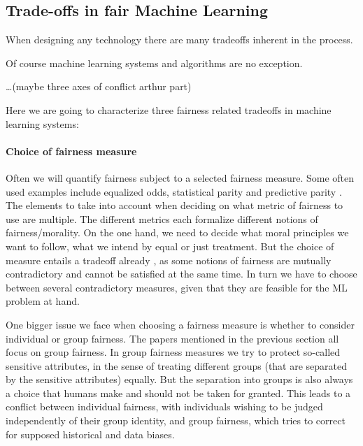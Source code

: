 
	\subsection{Trade-offs in fair Machine Learning}
	When designing any technology \cite{alexander1964notes} there are many tradeoffs inherent in the process.
	
	Of course machine learning systems and algorithms are no exception.

	\dots (maybe three axes of conflict arthur part)

	Here we are going to characterize three fairness related tradeoffs in machine learning systems:
	
	
	\paragraph{Choice of fairness measure}
	Often we will quantify fairness subject to a selected fairness measure.
	Some often used examples include equalized odds, statistical parity and predictive parity \cite{garg2020fairness}.
    The elements to take into account when deciding on what metric of fairness to use are multiple.
	The different metrics each formalize different notions of fairness/morality.
    On the one hand, we need to decide what moral principles we want to follow, \ie what we intend by equal or just treatment.
	But the choice of measure entails a tradeoff already \cite{chouldechova2017fair}\cite{kleinberg2016inherent}\cite{berk2021fairness}, as some notions of fairness are mutually contradictory and cannot be satisfied at the same time.
	In turn we have to choose between several contradictory measures, given that they are feasible for the ML problem at hand.

	One bigger issue we face when choosing a fairness measure is whether to consider individual or group fairness.
	The papers mentioned in the previous section all focus on group fairness.
	In group fairness measures we try to protect so-called sensitive attributes, in the sense of treating different groups (that are separated by the sensitive attributes) equally.
	But the separation into groups is also always a choice that humans make and should not be taken for granted.
    This leads to a conflict between individual fairness, with individuals wishing to be judged independently of their group identity, and group fairness, which tries to correct for supposed historical and data biases.

